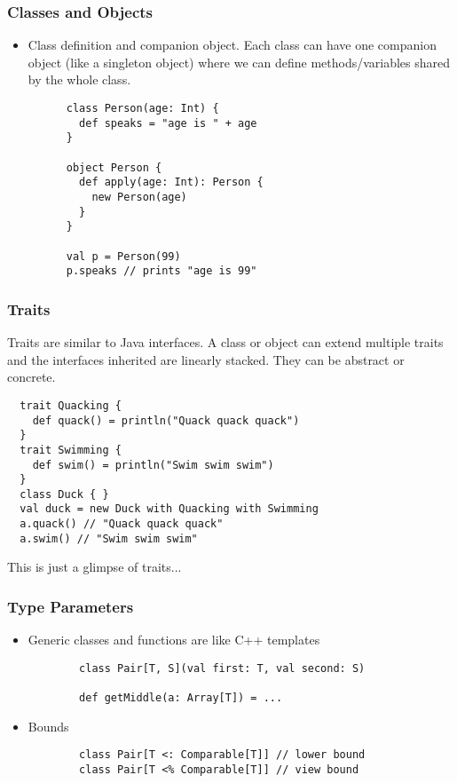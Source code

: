\documentclass[handout]{beamer}
\begin{document}
\begin{frame}[fragile]
  \frametitle{Classes and Objects}
  \begin{itemize}
    \item Class definition and companion object. Each class can have one companion object (like a singleton object) where we can define methods/variables shared by the whole class.
      \begin{verbatim}
      class Person(age: Int) {
        def speaks = "age is " + age
      }

      object Person {
        def apply(age: Int): Person {
          new Person(age)
        }
      }

      val p = Person(99)
      p.speaks // prints "age is 99"
      \end{verbatim}
  \end{itemize}
\end{frame}

\begin{frame}[fragile]
  \frametitle{Traits}
  Traits are similar to Java interfaces. A class or object can extend multiple traits and the interfaces inherited are linearly stacked. They can be abstract or concrete.
  \begin{verbatim}
  trait Quacking {
    def quack() = println("Quack quack quack")
  }
  trait Swimming {
    def swim() = println("Swim swim swim")
  }
  class Duck { }
  val duck = new Duck with Quacking with Swimming
  a.quack() // "Quack quack quack"
  a.swim() // "Swim swim swim"
  \end{verbatim}
  This is just a glimpse of traits...
\end{frame}

\begin{frame}[fragile]
  \frametitle{Type Parameters}
  \begin{itemize}
      \item Generic classes and functions are like C++ templates
        \begin{verbatim}
        class Pair[T, S](val first: T, val second: S)

        def getMiddle(a: Array[T]) = ...
        \end{verbatim}
      \item Bounds
        \begin{verbatim}
        class Pair[T <: Comparable[T]] // lower bound
        class Pair[T <% Comparable[T]] // view bound
        \end{verbatim}
  \end{itemize}
\end{frame}
\end{document}
